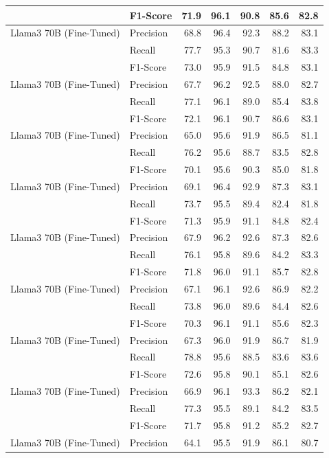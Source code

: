 \begin{table}[!ht]
\begin{tabular}{llrrrrr}
 & F1-Score & 71.9 & 96.1 & 90.8 & 85.6 & 82.8 \\
\midrule
Llama3 70B
(Fine-Tuned) & Precision & 68.8 & 96.4 & 92.3 & 88.2 & 83.1 \\
 & Recall & 77.7 & 95.3 & 90.7 & 81.6 & 83.3 \\
 & F1-Score & 73.0 & 95.9 & 91.5 & 84.8 & 83.1 \\
\midrule
Llama3 70B
(Fine-Tuned) & Precision & 67.7 & 96.2 & 92.5 & 88.0 & 82.7 \\
 & Recall & 77.1 & 96.1 & 89.0 & 85.4 & 83.8 \\
 & F1-Score & 72.1 & 96.1 & 90.7 & 86.6 & 83.1 \\
\midrule
Llama3 70B
(Fine-Tuned) & Precision & 65.0 & 95.6 & 91.9 & 86.5 & 81.1 \\
 & Recall & 76.2 & 95.6 & 88.7 & 83.5 & 82.8 \\
 & F1-Score & 70.1 & 95.6 & 90.3 & 85.0 & 81.8 \\
\midrule
Llama3 70B
(Fine-Tuned) & Precision & 69.1 & 96.4 & 92.9 & 87.3 & 83.1 \\
 & Recall & 73.7 & 95.5 & 89.4 & 82.4 & 81.8 \\
 & F1-Score & 71.3 & 95.9 & 91.1 & 84.8 & 82.4 \\
\midrule
Llama3 70B
(Fine-Tuned) & Precision & 67.9 & 96.2 & 92.6 & 87.3 & 82.6 \\
 & Recall & 76.1 & 95.8 & 89.6 & 84.2 & 83.3 \\
 & F1-Score & 71.8 & 96.0 & 91.1 & 85.7 & 82.8 \\
\midrule
Llama3 70B
(Fine-Tuned) & Precision & 67.1 & 96.1 & 92.6 & 86.9 & 82.2 \\
 & Recall & 73.8 & 96.0 & 89.6 & 84.4 & 82.6 \\
 & F1-Score & 70.3 & 96.1 & 91.1 & 85.6 & 82.3 \\
\midrule
Llama3 70B
(Fine-Tuned) & Precision & 67.3 & 96.0 & 91.9 & 86.7 & 81.9 \\
 & Recall & 78.8 & 95.6 & 88.5 & 83.6 & 83.6 \\
 & F1-Score & 72.6 & 95.8 & 90.1 & 85.1 & 82.6 \\
\midrule
Llama3 70B
(Fine-Tuned) & Precision & 66.9 & 96.1 & 93.3 & 86.2 & 82.1 \\
 & Recall & 77.3 & 95.5 & 89.1 & 84.2 & 83.5 \\
 & F1-Score & 71.7 & 95.8 & 91.2 & 85.2 & 82.7 \\
\midrule
Llama3 70B
(Fine-Tuned) & Precision & 64.1 & 95.5 & 91.9 & 86.1 & 80.7 \\

\end{tabular}
\end{table}
